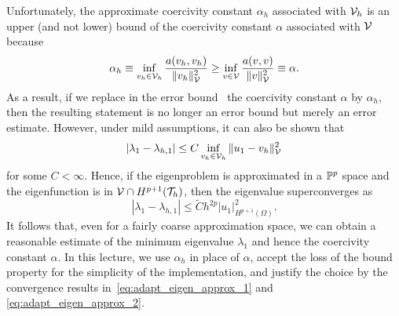 Unfortunately, the approximate coercivity constant $\alpha_h$ associated with $\mathcal{V}_h$ is an upper (and not lower) bound of the coercivity constant $\alpha$ associated with $\mathcal{V}$ because
\begin{equation*}
  \alpha_{h}
  \equiv \inf_{v_h \in \mathcal{V}_h} \frac{a(v_h,v_h)}{\| v_h \|_{\mathcal{V}}^2}
  \geq
  \inf_{v \in \mathcal{V}} \frac{a(v,v)}{\| v \|_{\mathcal{V}}^2}
  \equiv \alpha.
\end{equation*}
As a result, if we replace in the error bound~\label{eq:adapt_err_bnd} the coercivity constant $\alpha$ by $\alpha_h$, then the resulting statement is no longer an error bound but merely an error estimate.  However, under mild assumptions, it can also be shown that
\begin{equation}
  | \lambda_1 - \lambda_{h,1}  |
  \leq
  C \inf_{v_h \in \mathcal{V}_h} \| u_1 - v_{h} \|^2_{\mathcal{V}}
  \label{eq:adapt_eigen_approx_1}
\end{equation}
for some $C < \infty$. Hence, if the eigenproblem is approximated in a $\mathbb{P}^p$ space and the eigenfunction is in $\mathcal{V} \cap H^{p+1}(\mathcal{T}_h)$, then the eigenvalue superconverges as
\begin{equation}
  | \lambda_1 - \lambda_{h,1} |
  \leq
  \tilde C h^{2p} | u_1 |^2_{H^{p+1}(\Omega)}.
  \label{eq:adapt_eigen_approx_2}
\end{equation}
It follows that, even for a fairly coarse approximation space, we can obtain a reasonable estimate of the minimum eigenvalue $\lambda_1$ and hence the coercivity constant $\alpha$.  In this lecture, we use $\alpha_h$ in place of $\alpha$, accept the loss of the bound property for the simplicity of the implementation, and justify the choice by the convergence results in~\eqref{eq:adapt_eigen_approx_1} and \eqref{eq:adapt_eigen_approx_2}.


